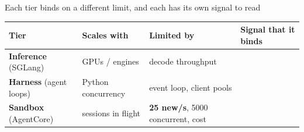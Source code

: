 \begin{frame}{Each tier binds on a different limit, and each has its own signal to read}
\footnotesize\renewcommand{\arraystretch}{1.2}
\begin{tabularx}{\textwidth}{@{}l l Y l@{}}
\toprule
\textbf{Tier} & \textbf{Scales with} & \textbf{Limited by} & \textbf{Signal that it binds}\\
\midrule
\textbf{Inference} (SGLang) & GPUs / engines & decode throughput & \\
\textbf{Harness} (agent loops) & Python concurrency & event loop, client pools & \\
\textbf{Sandbox} (AgentCore) & sessions in flight & \textbf{25 new/s}, 5000 concurrent, cost & \\
\bottomrule
\end{tabularx}
\par\vspace{4mm}
\end{frame}

